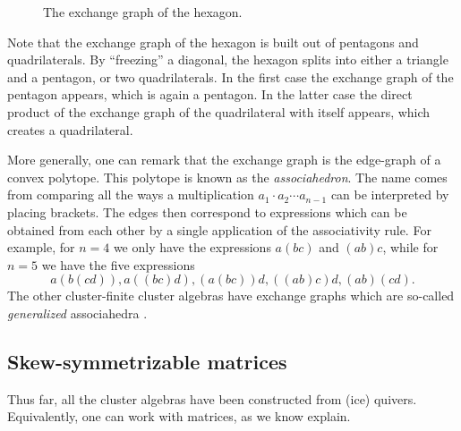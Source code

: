 \begin{example}
\begin{figure}[ht!]
		\caption{The exchange graph of the hexagon.}
		\label{fig:hexagon_exchange_graph}
	\end{figure}

	Note that the exchange graph of the hexagon is built out of pentagons and
	quadrilaterals. By ``freezing'' a diagonal, the hexagon splits into either a triangle
	and a pentagon, or two quadrilaterals. In the first case the exchange graph of the
	pentagon appears, which is again a pentagon. In the latter case the direct product of
	the exchange graph of the quadrilateral with itself appears, which creates a
	quadrilateral.

	More generally, one can remark that the exchange graph is the edge-graph of a convex
	polytope. This polytope is known as the \emph{associahedron}. The
	name comes from comparing all the ways a multiplication $a_1 \cdot a_2 \cdots a_{n-1}$
	can be interpreted by placing brackets. The edges then correspond to expressions which
	can be obtained from each other by a single application of the associativity rule. For
	example, for $n=4$ we only have the expressions $a(bc)$ and $(ab)c$, while for $n=5$ we
	have the five expressions
	\begin{equation*}
		a(b(cd)), a((bc)d), (a(bc))d, ((ab)c)d, (ab)(cd).
	\end{equation*}
	The other cluster-finite cluster algebras have exchange graphs which are so-called
	\emph{generalized} associahedra \parencite[Theorem 1.13]{FominZelevinsky2003CAFin}.
\end{example}

\subsection{Skew-symmetrizable matrices}

Thus far, all the cluster algebras have been constructed from (ice) quivers.
Equivalently, one can work with matrices, as we know explain.

